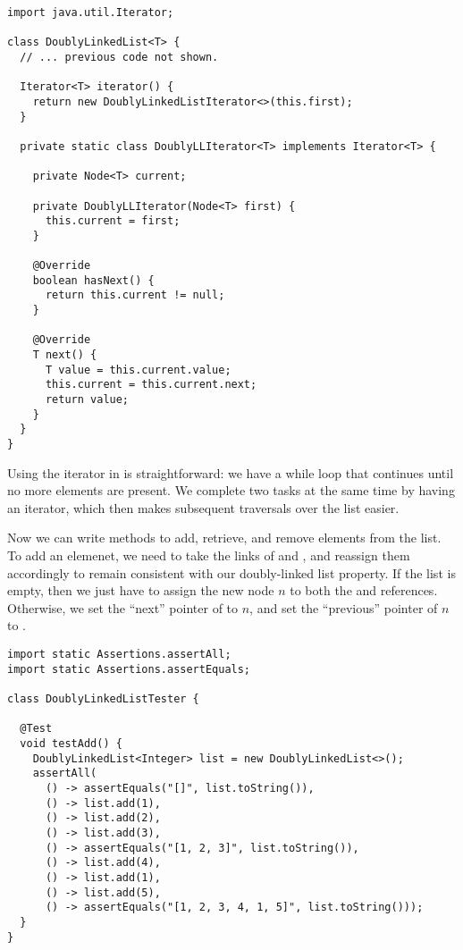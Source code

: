 \begin{lstlisting}[language=MyJava]
import java.util.Iterator;

class DoublyLinkedList<T> {
  // ... previous code not shown.

  Iterator<T> iterator() {
    return new DoublyLinkedListIterator<>(this.first);
  }

  private static class DoublyLLIterator<T> implements Iterator<T> {
    
    private Node<T> current;

    private DoublyLLIterator(Node<T> first) {
      this.current = first;
    }

    @Override
    boolean hasNext() { 
      return this.current != null; 
    }

    @Override
    T next() {
      T value = this.current.value;
      this.current = this.current.next;
      return value;
    }
  }
}
\end{lstlisting}

Using the iterator in  is straightforward: we have a while loop that continues until no more elements are present. We complete two tasks at the same time by having an iterator, which then makes subsequent traversals over the list easier.

Now we can write methods to add, retrieve, and remove elements from the list. To add an elemenet, we need to take the links of  and , and reassign them accordingly to remain consistent with our doubly-linked list property. If the list is empty, then we just have to assign the new node $n$ to both the  and  references. Otherwise, we set the ``next'' pointer of  to $n$, and set the ``previous'' pointer of $n$ to . 

\begin{lstlisting}[language=MyJava]
import static Assertions.assertAll;
import static Assertions.assertEquals;

class DoublyLinkedListTester {

  @Test
  void testAdd() {
    DoublyLinkedList<Integer> list = new DoublyLinkedList<>();
    assertAll(
      () -> assertEquals("[]", list.toString()),
      () -> list.add(1),
      () -> list.add(2),
      () -> list.add(3),
      () -> assertEquals("[1, 2, 3]", list.toString()),
      () -> list.add(4),
      () -> list.add(1),
      () -> list.add(5),
      () -> assertEquals("[1, 2, 3, 4, 1, 5]", list.toString()));
  }
}
\end{lstlisting}

